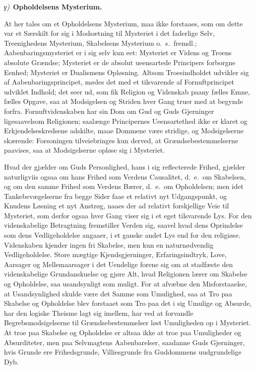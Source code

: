 \documentclass[12pt]{book}
\newcommand{\greekrun}[2]{%
  \medskip\begin{center}{\itshape #1)}\ {\bfseries #2}\end{center}\medskip}
\begin{document}
\greekrun{γ}{Opholdelsens Mysterium.}

At her tales om et Opholdelsens Mysterium, maa ikke forstaaes, som
om dette var et Særskilt for sig i Modsætning til Mysteriet i det
faderlige Selv, Treenighedens Mysterium, Skabelsens Mysterium o.\ s.\
fremdl.; Aabenbaringsmysteriet er i sig selv kun eet: Mysteriet er
Videns og Troens absolute Grændse; Mysteriet er de absolut
ueensartede Principers forborgne Eenhed; Mysteriet er Dualismens
Opløsning. Altsom Troesindholdet udvikler sig af
Aabenbaringsprincipet, mødes det med et tilsvarende af
Fornuftprincipet udviklet Indhold; det seer ud, som fik Religion og
Videnskab paany fælles Emne, fælles Opgave, saa at Modsigelsen og
Striden hver Gang truer med at begynde forfra. Fornuftvidenskaben
har sin Dom om Gud og Guds Gjerninger ligesaavelsom Religionen;
saalænge Principernes Ueensartethed ikke er klaret og
Erkjendelseskredsene adskilte, maae Dommene være stridige, og
Modsigelserne skærende: Forsoningen tilveiebringes kun derved, at
Grændsebestemmelserne paavises, saa at Modsigelserne opløse sig i
Mysteriet.

Hvad der gjælder om Guds Personlighed, hans i sig reflecterede
Frihed, gjælder naturligviis ogsaa om hans Frihed som Verdens
Causalitet, d.\ e.\ om Skabelsen, og om den samme Frihed som Verdens
Bærer, d.\ e.\ om Opholdelsen; men idet Tankebevægelserne fra begge
Sider faae et relativt nyt Udgangspunkt, og Knudens Løsning et nyt
Anstrøg, naaes der ad relativt forskjellige Veie til Mysteriet, som
derfor ogsaa hver Gang viser sig i et eget tilsvarende Lys.
For den videnskabelige Betragtning fremstiller Verden sig, saavel
hvad dens Oprindelse som dens Vedligeholdelse angaaer, i et ganske
andet Lys end for den religiøse. Videnskaben kjender ingen fri
Skabelse, men kun en naturnødvendig Vedligeholdelse. Store mægtige
Kjendsgjerninger, Erfaringsindtryk, Love, Aarsager og
Mellemaarsager i det Uendelige forene sig om at stadfæste den
videnskabelige Grundanskuelse og gjøre Alt, hvad Religionen lærer om
Skabelse og Opholdelse, saa usandsynligt som muligt. For at afvæbne
den Misforstaaelse, at Usandsynlighed skulde være det Samme som
Umulighed, saa at Tro paa Skabelse og Opholdelse blev forstaaet som
Tro paa det i sig Umulige og Absurde, har den logiske Theisme lagt
sig imellem, har ved at forvandle Begrebsmodsigelserne til
Grændsebestemmelser løst Umuligheden op i Mysteriet. At troe paa
Skabelse og Opholdelse er altsaa ikke at troe paa Umuligheder og
Absurditeter, men paa Selvmagtens Aabenbarelser, saadanne Guds
Gjerninger, hvis Grunde ere Frihedsgrunde, Villiesgrunde fra
Guddommens uudgrundelige Dyb.
\end{document}
